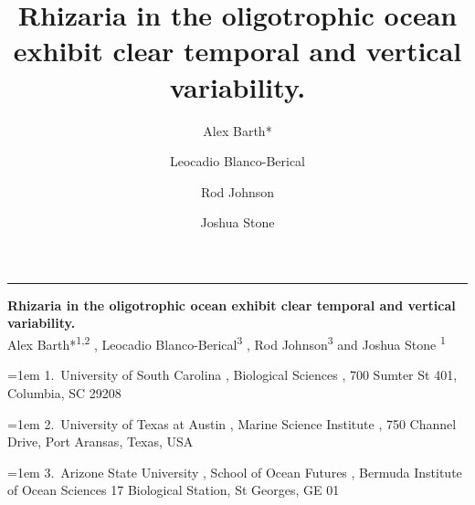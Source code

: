 \documentclass[
]{article}
\title{Rhizaria in the oligotrophic ocean exhibit clear temporal and
vertical variability.}
\author{Alex Barth* \and Leocadio Blanco-Berical \and Rod
Johnson \and Joshua Stone}
\date{}
\begin{document}
    \begin{titlepage}

\raggedleft %
\rule{1pt}{\textheight} %
\hspace{0.05\textwidth} %
\begin{minipage}[b][\textheight][s]{0.85\textwidth}

\raggedright
{\large\bfseries\nohyphens{Rhizaria in the oligotrophic ocean exhibit
clear temporal and vertical variability.}}\\[2\baselineskip] 

  
 {\large{Alex
Barth*}}{\textsuperscript{1}}\textsuperscript{,}{\textsuperscript{2}}%
%
, 
 {\large{Leocadio Blanco-Berical}}{\textsuperscript{3}}%
%
, 
 {\large{Rod Johnson}}{\textsuperscript{3}}%
%
%
{ and \large{Joshua Stone}}%
{\textsuperscript{1}}%
%



  
\vspace{2\baselineskip} 

\hangindent=1em
%
{1}.~{University of South Carolina}%
%
, %
{Biological Sciences}%
%
%
, %
{700 Sumter St 401, Columbia, SC 29208}%
%
\par\hangindent=1em%
%
{2}.~{University of Texas at Austin}%
%
, %
{Marine Science Institute}%
%
%
, %
{750 Channel Drive, Port Aransas, Texas, USA}%
%
\par\hangindent=1em%
%
{3}.~{Arizone State University}%
%
, %
{School of Ocean Futures}%
%
%
, %
{Bermuda Institute of Ocean Sciences 17 Biological Station, St Georges,
GE 01}%
%

  
\vspace{1\baselineskip} 

                  


\end{minipage}
\end{titlepage}
\end{document}
